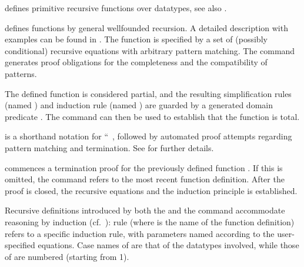 \begin{isabellebody}
\begin{isamarkuptext}
  \begin{descr}

  \item [\hyperlink{command.HOL.primrec}{\mbox{\isa{\isacommand{primrec}}}}] defines primitive recursive
  functions over datatypes, see also \cite{isabelle-HOL}.

  \item [\hyperlink{command.HOL.function}{\mbox{\isa{\isacommand{function}}}}] defines functions by general
  wellfounded recursion. A detailed description with examples can be
  found in \cite{isabelle-function}. The function is specified by a
  set of (possibly conditional) recursive equations with arbitrary
  pattern matching. The command generates proof obligations for the
  completeness and the compatibility of patterns.

  The defined function is considered partial, and the resulting
  simplification rules (named ) and induction rule
  (named ) are guarded by a generated domain
  predicate . The \hyperlink{command.HOL.termination}{\mbox{}}
  command can then be used to establish that the function is total.

  \item [\hyperlink{command.HOL.fun}{\mbox{\isa{\isacommand{fun}}}}] is a shorthand notation for
  ``\hyperlink{command.HOL.function}{\mbox{}}~, followed by
  automated proof attempts regarding pattern matching and termination.
  See \cite{isabelle-function} for further details.

  \item [\hyperlink{command.HOL.termination}{\mbox{\isa{\isacommand{termination}}}}~\isa{f}] commences a
  termination proof for the previously defined function .  If
  this is omitted, the command refers to the most recent function
  definition.  After the proof is closed, the recursive equations and
  the induction principle is established.

  \end{descr}


  Recursive definitions introduced by both the \hyperlink{command.HOL.primrec}{\mbox{}} and the \hyperlink{command.HOL.function}{\mbox{}} command accommodate
  reasoning by induction (cf.\ ): rule  (where  is the name of the function definition)
  refers to a specific induction rule, with parameters named according
  to the user-specified equations.  Case names of \hyperlink{command.HOL.primrec}{\mbox{}} are that of the datatypes involved, while those of
  \hyperlink{command.HOL.function}{\mbox{}} are numbered (starting from 1).


\end{isamarkuptext}
\end{isabellebody}
